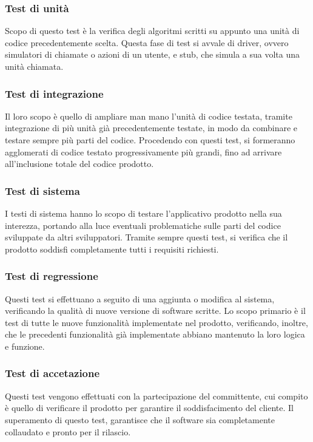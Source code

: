 \subsubsection{Test di unità}
Scopo di questo test è la verifica degli algoritmi scritti su appunto una unità di codice precedentemente scelta. Questa fase di test si avvale di driver, ovvero simulatori di chiamate o azioni di un utente, e stub, che simula a sua volta una unità chiamata.

\subsubsection{Test di integrazione}
Il loro scopo è quello di ampliare man mano l’unità di codice testata, tramite integrazione di più unità già precedentemente testate, in modo da combinare e testare sempre più parti del codice. Procedendo con questi test, si formeranno agglomerati di codice testato progressivamente più grandi, fino ad arrivare all’inclusione totale del codice prodotto.

\subsubsection{Test di sistema}
I testi di sistema hanno lo scopo di testare l’applicativo prodotto nella sua interezza, portando alla luce eventuali problematiche sulle parti del codice sviluppate da altri sviluppatori. Tramite sempre questi test, si verifica che il prodotto soddisfi completamente tutti i requisiti richiesti.

\subsubsection{Test di regressione}
Questi test si effettuano a seguito di una aggiunta o modifica al sistema, verificando la qualità di nuove versione di software scritte. Lo scopo primario è il test di tutte le nuove funzionalità implementate nel prodotto, verificando, inoltre, che le precedenti funzionalità già implementate abbiano mantenuto la loro logica e funzione.

\subsubsection{Test di accetazione}
Questi test vengono effettuati con la partecipazione del committente, cui compito è quello di verificare il prodotto per garantire il soddisfacimento del cliente. Il superamento di questo test, garantisce che il software sia completamente collaudato e pronto per il rilascio.

